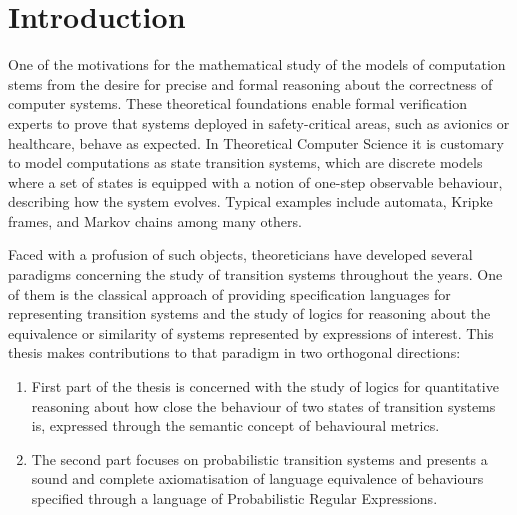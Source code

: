 \chapter{Introduction}
\label{chapter:introduction}

One of the motivations for the mathematical study of the models of computation stems from the desire for precise and formal reasoning about the correctness of computer systems. These theoretical foundations enable formal verification experts to prove that systems deployed in safety-critical areas, such as avionics or healthcare, behave as expected. In Theoretical Computer Science it is customary to model computations as state transition systems, which are discrete models where a set of states is equipped with a notion of one-step observable behaviour, describing how the system evolves. Typical examples include automata, Kripke frames, and Markov chains among many others. 

Faced with a profusion of such objects, theoreticians have developed several paradigms concerning the study of transition systems throughout the years. One of them is the classical approach of providing specification languages for representing transition systems and the study of logics for reasoning about the equivalence or similarity of systems represented by expressions of interest. This thesis makes contributions to that paradigm in two orthogonal directions:
\begin{enumerate}
	\item First part of the thesis is concerned with the study of logics for quantitative reasoning about how close the behaviour of two states of transition systems is, expressed through the semantic concept of behavioural metrics.
	\item The second part focuses on probabilistic transition systems and presents a sound and complete axiomatisation of language equivalence of behaviours specified through a language of Probabilistic Regular Expressions.
	\end{enumerate}
	


